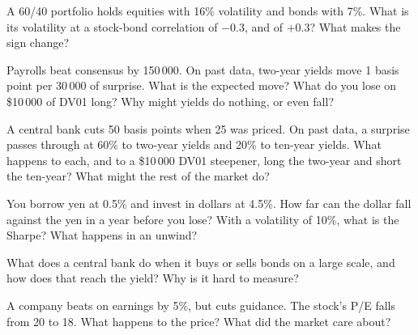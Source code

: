 \begin{question}\label{iq:iv2:macro-market-knowledge-and-pitches:11}
A 60/40 portfolio holds equities with 16\% volatility and bonds with 7\%. What is its volatility at a stock-bond correlation of $-0.3$, and of $+0.3$? What makes the sign change?
\end{question}

\begin{question}\label{iq:iv2:macro-market-knowledge-and-pitches:12}
Payrolls beat consensus by 150\,000. On past data, two-year yields move 1 basis point per 30\,000 of surprise. What is the expected move? What do you lose on \$10\,000 of DV01 long? Why might yields do nothing, or even fall?
\end{question}

\begin{question}\label{iq:iv2:macro-market-knowledge-and-pitches:13}
A central bank cuts 50 basis points when 25 was priced. On past data, a surprise passes through at 60\% to two-year yields and 20\% to ten-year yields. What happens to each, and to a \$10\,000 DV01 steepener, long the two-year and short the ten-year? What might the rest of the market do?
\end{question}

\begin{question}\label{iq:iv2:macro-market-knowledge-and-pitches:14}
You borrow yen at 0.5\% and invest in dollars at 4.5\%. How far can the dollar fall against the yen in a year before you lose? With a volatility of 10\%, what is the Sharpe? What happens in an unwind?
\end{question}

\begin{question}\label{iq:iv2:macro-market-knowledge-and-pitches:15}
What does a central bank do when it buys or sells bonds on a large scale, and how does that reach the yield? Why is it hard to measure?
\end{question}

\begin{question}\label{iq:iv2:macro-market-knowledge-and-pitches:16}
A company beats on earnings by 5\%, but cuts guidance. The stock's P/E falls from 20 to 18. What happens to the price? What did the market care about?
\end{question}

